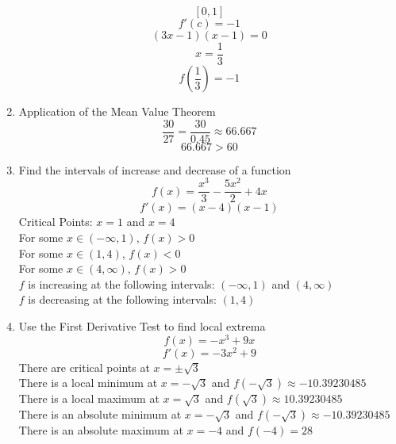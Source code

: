 \documentclass{article}
\begin{document}
\begin{enumerate}
    $$[0, 1]$$
    $$f'(c) = -1$$
    $$(3x - 1)(x - 1) = 0$$
    $$x = \frac{1}{3}$$
    $$f\left(\frac{1}{3}\right) = -1$$
    \item Application of the Mean Value Theorem
    $$\frac{30}{27} = \frac{30}{0.45} \approx 66.667$$
    $$66.667 > 60$$
    \item Find the intervals of increase and decrease of a function
    $$f(x) = \frac{x^3}{3} - \frac{5x^2}{2} + 4x$$
    $$f'(x) = \left(x - 4\right)\left(x - 1\right)$$
    Critical Points: $x = 1$ and $x = 4$ \\
    For some $x \in (-\infty, 1)$, $f(x) > 0$ \\
    For some $x \in (1, 4)$, $f(x) < 0$ \\
    For some $x \in (4, \infty)$, $f(x) > 0$ \\
    $f$ is increasing at the following intervals: $(-\infty, 1)$ and $(4, \infty)$ \\
    $f$ is decreasing at the following intervals: $(1, 4)$
    \item Use the First Derivative Test to find local extrema
    $$f(x) = -x^3 + 9x$$
    $$f'(x) = -3x^2 + 9$$
    There are critical points at $x = \pm \sqrt{3}$ \\
    There is a local minimum at $x = -\sqrt{3}$ and $f(-\sqrt{3}) \approx -10.39230485$ \\
    There is a local maximum at $x = \sqrt{3}$ and $f(\sqrt{3}) \approx 10.39230485$ \\
    There is an absolute minimum at $x = -\sqrt{3}$ and $f(-\sqrt{3}) \approx -10.39230485$ \\
    There is an absolute maximum at $x = -4$ and $f(-4) = 28$
\end{enumerate}
\end{document}

